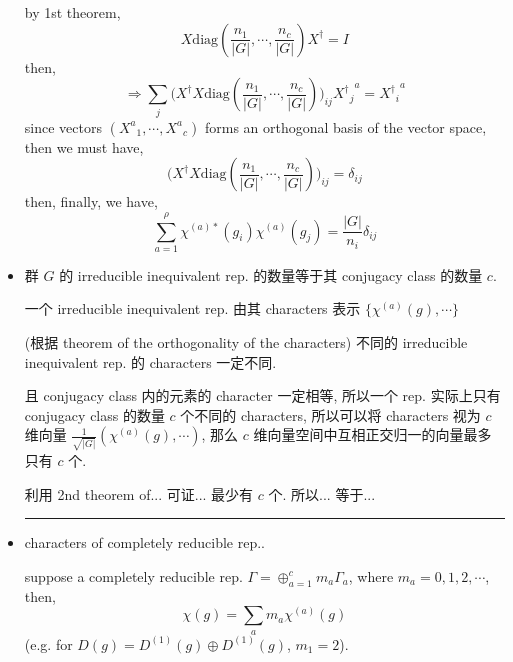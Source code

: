 \begin{itemize}
	\begin{tcolorbox}[title=proof:]
		by 1st theorem,
		\begin{equation}
			X \mathrm{diag}(\frac{n_1}{|G|}, \cdots, \frac{n_c}{|G|}) X^\dagger = I
		\end{equation}
		then,
		\begin{equation}
			\Longrightarrow \sum_j \Big( X^\dagger X \mathrm{diag}(\frac{n_1}{|G|}, \cdots, \frac{n_c}{|G|}) \Big)_{i j} {{X^\dagger}_j}^a = {{X^\dagger}_i}^a
		\end{equation}
		since vectors $({X^a}_1, \cdots, {X^a}_c)$ forms an orthogonal basis of the vector space, then we must have,
		\begin{equation}
			\Big( X^\dagger X \mathrm{diag}(\frac{n_1}{|G|}, \cdots, \frac{n_c}{|G|}) \Big)_{i j} = \delta_{i j}
		\end{equation}
		then, finally, we have,
		\begin{equation}
			\sum_{a = 1}^\rho \chi^{(a) *}(g_i) \chi^{(a)}(g_j) = \frac{|G|}{n_i} \delta_{i j}
		\end{equation}
	\end{tcolorbox}
	
	\item 群 $G$ 的 irreducible inequivalent rep. 的数量等于其 conjugacy class 的数量 $c$.
	
	\begin{tcolorbox}[title=proof:]
		一个 irreducible inequivalent rep. 由其 characters 表示 $\{\chi^{(a)}(g), \cdots\}$
		
		(根据 theorem of the orthogonality of the characters) 不同的 irreducible inequivalent rep. 的 characters 一定不同.
		
		且 conjugacy class 内的元素的 character 一定相等, 所以一个 rep. 实际上只有 conjugacy class 的数量 $c$ 个不同的 characters, 所以可以将 characters 视为 $c$ 维向量 $\frac{1}{\sqrt{|G|}} (\chi^{(a)}(g), \cdots)$, 那么 $c$ 维向量空间中互相正交归一的向量最多只有 $c$ 个.
		
		利用 2nd theorem of... 可证... 最少有 $c$ 个. 所以... 等于...
	\end{tcolorbox}
	
	\noindent\rule[0.5ex]{\linewidth}{0.5pt} %
	
	\item characters of completely reducible rep..
	
	suppose a completely reducible rep. $\Gamma = \oplus_{a = 1}^c m_a \Gamma_a$, where $m_a = 0, 1, 2, \cdots$, then,
	\begin{equation}
		\chi(g) = \sum_a m_a \chi^{(a)}(g)
	\end{equation}
	(e.g. for $D(g) = D^{(1)}(g) \oplus D^{(1)}(g)$, $m_1 = 2$).
	

\end{itemize}
